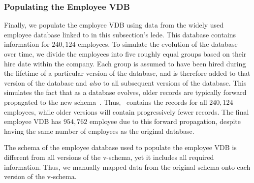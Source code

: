 \subsubsection{Populating the Employee VDB}
\label{sec:emp-pop}

Finally, we populate the employee VDB using data from the widely used employee
database linked to in this subsection's lede.
%
This database contains information for $240,124$ employees. To simulate the
evolution of the database over time, we divide the employees into five roughly
equal groups based on their hire date within the company. 
%
Each group is assumed to have been hired during the lifetime of a particular
version of the database, and is therefore added to that version of the database
and \emph{also} to all subsequent versions of the database. This simulates the
fact that as a database evolves, older records are typically forward propagated
to the new schema~\cite{schVersioningSurvey95Roddick}. Thus, \vFive\ contains
the records for all $240,124$ employees, while older versions will contain
progressively fewer records.
%
The final employee VDB has $954,762$ employee due to this forward propagation,
despite having the same number of employees as the original database.


The schema of the employee database used to populate the employee VDB
 is different from all versions of the
v-schema, yet it includes all required information. Thus,
we manually mapped data from the original schema onto each version of
the v-schema.




